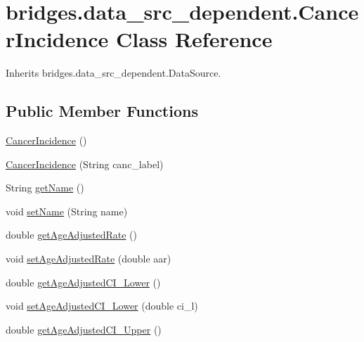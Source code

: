 \hypertarget{classbridges_1_1data__src__dependent_1_1_cancer_incidence}{}\section{bridges.\+data\+\_\+src\+\_\+dependent.\+Cancer\+Incidence Class Reference}
\label{classbridges_1_1data__src__dependent_1_1_cancer_incidence}


Inherits bridges.\+data\+\_\+src\+\_\+dependent.\+Data\+Source.

\subsection*{Public Member Functions}
\begin{DoxyCompactItemize}
\item 
\hyperlink{classbridges_1_1data__src__dependent_1_1_cancer_incidence_a92db1eb4292c77f07619019587caf5cc}{Cancer\+Incidence} ()
\item 
\hyperlink{classbridges_1_1data__src__dependent_1_1_cancer_incidence_a3db553c2769892563c3f1ebb033ba4c6}{Cancer\+Incidence} (String canc\+\_\+label)
\item 
String \hyperlink{classbridges_1_1data__src__dependent_1_1_cancer_incidence_ac7958f37807979cf06e712373f080b9a}{get\+Name} ()
\item 
void \hyperlink{classbridges_1_1data__src__dependent_1_1_cancer_incidence_a1aef58b128adfd1e2a31ab9726247e9e}{set\+Name} (String name)
\item 
double \hyperlink{classbridges_1_1data__src__dependent_1_1_cancer_incidence_a87bc1cbc5a72eb9b4df5ff7ab4843ae8}{get\+Age\+Adjusted\+Rate} ()
\item 
void \hyperlink{classbridges_1_1data__src__dependent_1_1_cancer_incidence_a26c2d63e8465bcfdab047129312b4897}{set\+Age\+Adjusted\+Rate} (double aar)
\item 
double \hyperlink{classbridges_1_1data__src__dependent_1_1_cancer_incidence_a7e5dab6d140f2a8e162c5d5c514c74c1}{get\+Age\+Adjusted\+C\+I\+\_\+\+Lower} ()
\item 
void \hyperlink{classbridges_1_1data__src__dependent_1_1_cancer_incidence_a4cd8ce7c68f00d2cd15928764cc32c09}{set\+Age\+Adjusted\+C\+I\+\_\+\+Lower} (double ci\+\_\+l)
\item 
double \hyperlink{classbridges_1_1data__src__dependent_1_1_cancer_incidence_ae7b71d91c3acae9fce3536f6a9d8362b}{get\+Age\+Adjusted\+C\+I\+\_\+\+Upper} ()

\end{DoxyCompactItemize}
